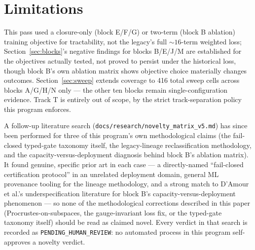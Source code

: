 \documentclass[11pt]{amsart}
\begin{document}
\section{Limitations}
This pass used a closure-only (block E/F/G) or two-term (block B ablation)
training objective for tractability, not the legacy's full $\sim 16$-term
weighted loss; Section~\ref{sec:blocks}'s negative findings for blocks
B/E/J/M are established for the objectives actually tested, not proved to
persist under the historical loss, though block B's own ablation matrix
shows objective choice materially changes outcomes. Section~\ref{sec:sweep}
extends coverage to 416 total sweep cells across blocks A/G/H/N only ---
the other ten blocks remain single-configuration evidence. Track T is
entirely out of scope, by the strict track-separation policy this
program enforces.

A follow-up literature search (\texttt{docs/research/novelty\_matrix\_v5.md})
has since been performed for three of this program's own methodological
claims (the fail-closed typed-gate taxonomy itself, the legacy-lineage
reclassification methodology, and the capacity-versus-deployment
diagnosis behind block B's ablation matrix). It found genuine, specific
prior art in each case --- a directly-named ``fail-closed certification
protocol'' in an unrelated deployment domain, general ML provenance
tooling for the lineage methodology, and a strong match to
D'Amour et al.'s underspecification literature for block B's
capacity-versus-deployment phenomenon --- so none of the methodological
corrections described in this paper (Procrustes-on-subspaces, the
gauge-invariant loss fix, or the typed-gate taxonomy itself) should be
read as claimed novel. Every verdict in that search is recorded as
\texttt{PENDING\_HUMAN\_REVIEW}: no automated process in this program
self-approves a novelty verdict.
\end{document}

